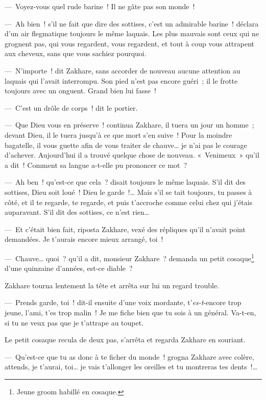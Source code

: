 \documentclass[french,twoside]{book} %
\begin{document}
— Voyez-vous quel rude barine ! Il ne gâte pas son monde !\par
— Ah bien ! s’il ne fait que dire des sottises, c’est un admirable barine ! déclara d’un air flegmatique toujours le même laquais. Les plus mauvais sont ceux qui ne grognent pas, qui vous regardent, vous regardent, et tout à coup vous attrapent aux cheveux, sans que vous sachiez pourquoi.\par
— N’importe ! dit Zakhare, sans accorder de nouveau aucune attention au laquais qui l’avait interrompu. Son pied n’est pas encore guéri ; il le frotte toujours avec un onguent. Grand bien lui fasse !\par
— C’est un drôle de corps ! dit le portier.\par
— Que Dieu vous en préserve ! continua Zakhare, il tuera un jour un homme ; devant Dieu, il le tuera jusqu’à ce que mort s’en suive ! Pour la moindre bagatelle, il vous guette afin de vous traiter de chauve… je n’ai pas le courage d’achever. Aujourd’hui il a trouvé quelque chose de nouveau. « Venimeux » qu’il a dit ! Comment sa langue a-t-elle pu prononcer ce mot ?\par
— Ah ben ! qu’est-ce que cela ? disait toujours le même laquais. S’il dit des sottises, Dieu soit loué ! Dieu le garde !… Mais s’il se tait toujours, tu passes à côté, et il te regarde, te regarde, et puis t’accroche comme celui chez qui j’étais auparavant. S’il dit des sottises, ce n’est rien…\par
— Et c’était bien fait, riposta Zakhare, vexé des répliques qu’il n’avait point demandées. Je t’aurais encore mieux arrangé, toi !\par
— Chauve… quoi ? qu’il a dit, monsieur Zakhare ? demanda un petit cosaque\footnote{Jeune groom habillé en cosaque.} d’une quinzaine d’années, est-ce diable ?\par
Zakhare tourna lentement la tête et arrêta sur lui un regard trouble.\par
— Prends garde, toi ! dit-il ensuite d’une voix mordante, t’\emph{es-t}-encore trop jeune, l’ami, t’es trop malin ! Je me fiche bien que tu sois à un général. Va-t-en, si tu ne veux pas que je t’attrape au toupet.\par
Le petit cosaque recula de deux pas, s’arrêta et regarda Zakhare en souriant.\par
— Qu’est-ce que tu as donc à te ficher du monde ! grogna Zakhare avec colère, attends, je t’aurai, toi… je vais t’allonger les oreilles et tu montreras tes dents !…\par
\end{document}
